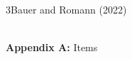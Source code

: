\documentclass[xcolor=table,9pt,aspectratio=169]{beamer}
\begin{document}
\begin{frame}{\vspace*{10mm}3\hspace*{1em}Bauer and Romann (2022)}
\vspace*{-5mm}
\begin{center}
   \\
   {\footnotesize\textbf{Appendix A:} Items}\\
\end{center}
\end{frame}
\end{document}
